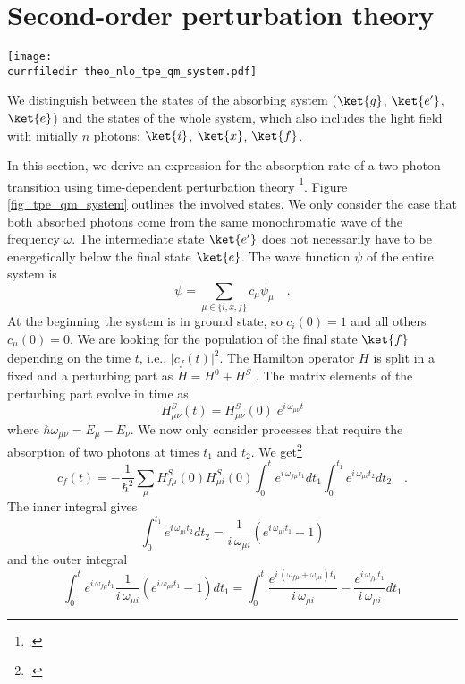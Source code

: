 \section{Second-order perturbation theory}

\begin{marginfigure}
\texttt{[image: \\currfiledir theo\_nlo\_tpe\_qm\_system.pdf]}
\caption{
We distinguish between the states of the absorbing system
($\ket{g}$, $\ket{e'}$, $\ket{e}$) and the states of the whole system, which
also includes the light field with initially $n$ photons: $\ket{i}$, $\ket{x}$, $\ket{f}$. }
\label{fig_tpe_qm_system}
\end{marginfigure}

In this section, we derive an expression for
the absorption rate of a two-photon transition using 
time-dependent perturbation theory
\footcite{Haken_wolf_II,mystre_quantum_optics}.
Figure \ref{fig_tpe_qm_system} outlines the involved
states. We only  consider the case
that both absorbed photons come from the same monochromatic
wave of the frequency $\omega$. The intermediate state 
$\ket{e'}$
does not necessarily have to be energetically below the final state $\ket{e}$.
The wave function $\psi$ of the entire system is
\begin{equation}
\psi = \sum_{\mu \in \{i, x, f\}} c_{\mu} \psi_{\mu} \quad.
\end{equation}
At the beginning the system is in ground state, so $c_i(0)
= 1$ and all others $c_{\mu}(0) = 0$. We are looking for the population
of the final state $\ket{f}$ depending on the time $t$, i.e.,
$|c_f(t)|^2$. The Hamilton operator $H$ is split in a fixed and a perturbing part as
 $H = H^0 + H^S$ . 
The matrix elements of the perturbing part evolve in time as
\begin{equation}
H^S_{\mu \nu} (t) = H^S_{\mu \nu} (0) \; e^{i \, \omega_{\mu \nu}
t}
\end{equation}
where $\hbar \omega_{\mu \nu} = E_{\mu} - E_{\nu}$.
We now only consider processes that require the absorption of two photons at times $t_1$ and $t_2$. We get\footcite{Haken_wolf_II}
\begin{equation}
c_f(t) = - \frac{1}{\hbar^2} \sum_{\mu} H^S_{f \mu} (0) H^S_{\mu
i} (0)\int_0^t e^{i \,\omega_{f \mu} t_1} dt_1 \int_0^{t_1} e^{i
\,\omega_{\mu i} t_2} dt_2 \quad .
\end{equation}
The inner integral gives
\begin{equation}
\int_0^{t_1} e^{i \,\omega_{\mu i} t_2} dt_2 =
\frac{1}{i \,\omega_{\mu i}} \left( e^{i \,\omega_{\mu i} t_1} -1
\right)
\end{equation}
and the outer integral
\begin{equation}
\int_0^t e^{i \,\omega_{f \mu} t_1} \frac{1}{i \,\omega_{\mu i}}
\left( e^{i \,\omega_{\mu i} t_1} -1 \right) dt_1 = %
\int_0^t  \frac{e^{i \,(\omega_{f \mu}+\omega_{ \mu i}) t_1}}{i
\,\omega_{\mu i}} %
-   \frac{e^{i \,\omega_{ f \mu } t_1}}{i \,\omega_{\mu i}} dt_1
\end{equation}

